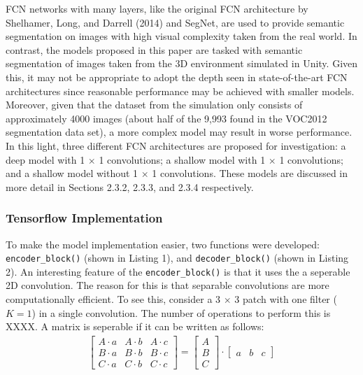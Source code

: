 \documentclass[a4paper]{article}
\begin{document}
FCN networks with many layers, like the original FCN architecture by Shelhamer, Long, and Darrell (2014) and SegNet, are used to provide semantic segmentation on images with high visual complexity taken from the real world. In contrast, the models proposed in this paper are tasked with semantic segmentation of images taken from the 3D environment simulated in Unity. Given this, it may not be appropriate to adopt the depth seen in state-of-the-art FCN architectures since reasonable performance may be achieved with smaller models. Moreover, given that the dataset from the simulation only consists of approximately 4000 images (about half of the 9,993 found in the VOC2012 segmentation data set), a more complex model may result in worse performance. In this light, three different FCN architectures are proposed for investigation: a deep model with 1 $\times$ 1 convolutions; a shallow model with 1 $\times$ 1 convolutions; and a shallow model without 1 $\times$ 1 convolutions. These models are discussed in more detail in Sections 2.3.2, 2.3.3, and 2.3.4 respectively. 

\subsubsection{Tensorflow Implementation}
To make the model implementation easier, two functions were developed: \verb|encoder_block()| (shown in Listing 1), and \verb|decoder_block()| (shown in Listing 2). An interesting feature of the \verb|encoder_block()| is that it uses the a seperable 2D convolution. The reason for this is that separable convolutions are more computationally efficient. To see this, consider a 3 $\times$ 3 patch with one filter ($K = 1$) in a single convolution. The number of operations to perform this is XXXX. A matrix is seperable if it can be written as follows:
\begin{align}
\begin{bmatrix}
A \cdot a & A \cdot b & A \cdot c\\
B \cdot a & B \cdot b & B \cdot c\\
C \cdot a & C \cdot b & C \cdot c
\end{bmatrix}
=
\begin{bmatrix}
A\\
B\\
C
\end{bmatrix}
\cdot
\begin{bmatrix}
a & b & c
\end{bmatrix}
\end{align}  
\end{document}
